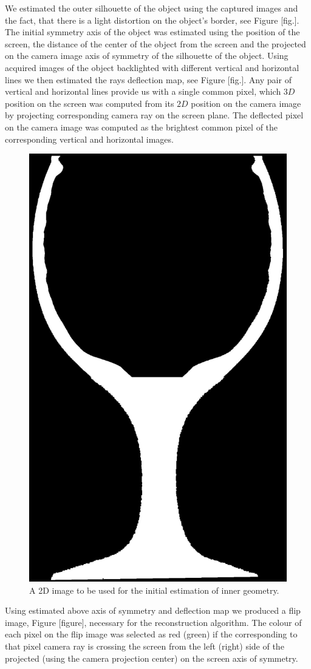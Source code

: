 \documentclass[10pt,twocolumn,letterpaper]{article}
\begin{document}
We estimated the outer silhouette of the object using the captured images and the fact, that there is a light distortion on the
object's border, see Figure [fig.]. The initial symmetry axis of the object was estimated using the position of the screen, the distance of the center of the object from the screen and the projected on the camera image axis of symmetry of the silhouette of the object. Using acquired images of the object backlighted with different vertical and horizontal lines we then estimated the rays deflection map, see Figure [fig.]. Any pair of vertical and horizontal lines provide us with a single common pixel, which $3D$ position on the screen was computed from its $2D$ position on the camera image by projecting corresponding camera ray on the screen plane. The deflected pixel on the camera image was computed as the brightest common pixel of the corresponding vertical and horizontal images.

\begin{figure}
  \centering
	\includegraphics[height=0.7\linewidth]{figure/coarse.jpg}	
  \caption{A 2D image to be used for the initial estimation of inner geometry.}
  \label{coarse}
\end{figure}

Using estimated above axis of symmetry and deflection map we produced a flip image, Figure [figure], necessary for the reconstruction algorithm. The colour of each pixel on the flip image was selected as red (green) if the corresponding to that pixel camera ray is crossing the screen from the left (right) side of the projected (using the camera projection center) on the screen axis of symmetry.  
\end{document}
